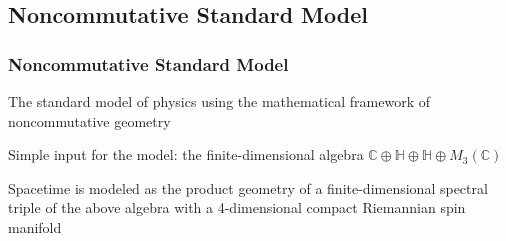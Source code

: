 \documentclass{beamer}
\def\C{{\mathbb C}}
\renewcommand{\H}{{\mathbb H}}
\begin{document}
\subsection{Noncommutative Standard Model}

\begin{frame}
\frametitle{Noncommutative Standard Model}

\begin{block}{}
The standard model of physics using the mathematical framework of noncommutative geometry 
\end{block}

\pause

\begin{block}{}
Simple input for the model: the finite-dimensional algebra $\C \oplus \H \oplus \H \oplus M_3(\C)$
\end{block}

\pause

\begin{block}{}
Spacetime is modeled as the product geometry of a finite-dimensional spectral triple of the above algebra with a 4-dimensional compact Riemannian spin manifold
\end{block}

\end{frame}
\end{document}
